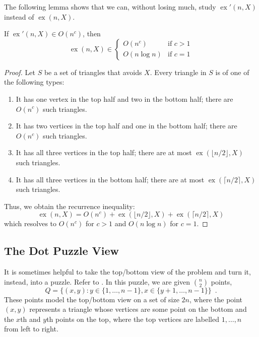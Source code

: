 \documentclass{patmorin}
\DeclareMathOperator{\ex}{ex}
\begin{document}
The following lemma shows that we can, without losing much, study $\ex'(n,X)$ instead of $\ex(n,X)$.

\begin{lem}
  If $\ex'(n,X)\in O(n^c)$, then
\[
   \ex(n,X)\in 
      \begin{cases} 
          O(n^c)     & \text{if $c>1$} \\
          O(n\log n) & \text{if $c=1$}
      \end{cases}
\]
\end{lem}

\begin{proof}
   Let $S$ be a set of triangles that avoids $X$.  
   Every triangle in $S$
   is of one of the following types:
   \begin{enumerate}
      \item It has one vertex in the top half and two in the bottom half; there are $O(n^{c})$ such triangles.
      \item It has two vertices in the top half and one in the bottom half; there are $O(n^{c})$ such triangles.
      \item It has all three vertices in the top half; there are at most $\ex(\lfloor n/2\rfloor,X)$ such triangles.
      \item It has all three vertices in the bottom half; there are at most $\ex(\lceil n/2\rceil,X)$ such triangles.
   \end{enumerate}
   Thus, we obtain the recurrence inequality:
   \[  \ex(n,X) = O(n^{c}) + \ex(\lfloor n/2\rfloor,X) + \ex(\lceil n/2\rceil,X) \]
   which resolves to $O(n^c)$ for $c>1$ and $O(n\log n)$ for $c=1$.
\end{proof}


\subsection{The Dot Puzzle View}

It is sometimes helpful to take the top/bottom view of the problem
and turn it, instead, into a puzzle.  Refer to .
In this puzzle, we are given $\binom{n}{2}$ points,
\[
    Q = \{(x,y): y\in\{1,\ldots,n-1\}, x\in\{y+1,\ldots,n-1\} \} \enspace .
\]
These points model the top/bottom view on a set of size $2n$, where the
point $(x,y)$ represents a triangle whose vertices are some point on
the bottom and the $x$th and $y$th points on the top, where the top
vertices are labelled $1,\ldots,n$ from left to right.
\end{document}
